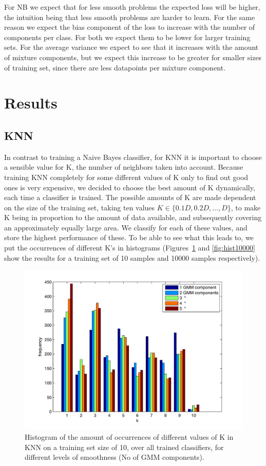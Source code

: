 \documentclass[a4paper]{article}
\begin{document}
For \ac{NB} we expect that for less smooth problems the expected loss will be higher, the intuition being that less smooth problems are harder to learn. For the same reason we expect the bias component of the loss to increase with the number of components per class. For both we expect them to be lower for larger training sets. For the average variance we expect to see that it increases with the amount of mixture components, but we expect this increase to be greater for smaller sizes of training set, since there are less datapoints per mixture component.

\section{Results}
\label{sec:results}

\subsection{KNN}
In contrast to training a Naive Bayes classifier, for KNN it is important to choose a sensible value for K, the number of neighbors taken into account. Because training KNN completely for some different values of K only to find out good ones is very expensive, we decided to choose the best amount of K dynamically, each time a classifier is trained. The possible amounts of K are made dependent on the size of the training set, taking ten values $K \in \{0.1D,0.2D,\ldots,D\}$, to make K being in proportion to the amount of data available, and subsequently covering an approximately equally large area. We classify for each of these values, and store the highest performance of these. To be able to see what this leads to, we put the occurrences of different K's in histograms (Figures~\ref{fig:hist10} and \ref{fig:hist10000} show the results for a training set of 10 samples and 10000 samples respectively).

\begin{figure}[htb]
    \centering
    \includegraphics[width=.9\textwidth]{Hist10.pdf}
    \caption{Histogram of the amount of occurrences of different values of K in KNN on a training set size of 10, over all trained classifiers, for different levels of smoothness (No of GMM components). \label{fig:hist10}}
\end{figure}
\end{document}
